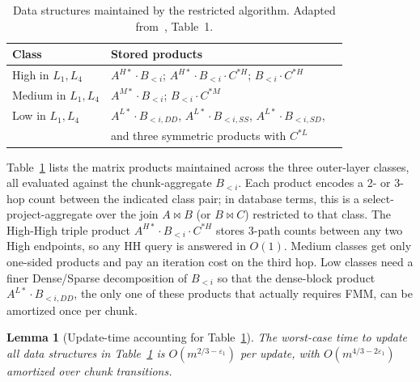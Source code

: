 \documentclass[sigconf,nonacm]{acmart}
\theoremstyle{plain}
\newtheorem{lemma}[theorem]{Lemma}
\theoremstyle{definition}
\begin{document}
\begin{table}[t]
  \centering
  \begin{tabular}{lll}
    \toprule
    Class & Stored products \\
    \midrule
    High in $L_1, L_4$    & $A^{H*}\!\cdot\!B_{<i}$;  $A^{H*}\!\cdot\!B_{<i}\!\cdot\!C^{*H}$;  $B_{<i}\!\cdot\!C^{*H}$ \\
    Medium in $L_1, L_4$  & $A^{M*}\!\cdot\!B_{<i}$;  $B_{<i}\!\cdot\!C^{*M}$ \\
    Low in $L_1, L_4$     & $A^{L*}\!\cdot\!B_{<i,DD}$, $A^{L*}\!\cdot\!B_{<i,SS}$, $A^{L*}\!\cdot\!B_{<i,SD}$, \\
                          & and three symmetric products with $C^{*L}$ \\
    \bottomrule
  \end{tabular}
  \caption{Data structures maintained by the restricted algorithm. Adapted from~\cite{AssadiShah25}, Table~1.}
  \label{tab:datastructures}
\end{table}

Table~\ref{tab:datastructures} lists the matrix products
maintained across the three outer-layer classes, all evaluated
against the chunk-aggregate $B_{<i}$. Each product encodes a 2- or
3-hop count between the indicated class pair; in database terms,
this is a select-project-aggregate over the join $A \bowtie B$ (or
$B \bowtie C$) restricted to that class. The High-High triple
product $A^{H*}\!\cdot\!B_{<i}\!\cdot\!C^{*H}$ stores 3-path counts
between any two High endpoints, so any HH query is answered in
$O(1)$. Medium classes get only one-sided products and pay an
iteration cost on the third hop. Low classes need a finer
Dense/Sparse decomposition of $B_{<i}$ so that the dense-block
product $A^{L*}\!\cdot\!B_{<i,DD}$, the only one of these
products that actually requires FMM, can be amortized once per
chunk.

\begin{lemma}[Update-time accounting for Table~\ref{tab:datastructures}]
\label{lem:warmup-update}
The worst-case time to update all data structures in Table~\ref{tab:datastructures} is $O(m^{2/3-\varepsilon_1})$ per update, with $O(m^{4/3-2\varepsilon_1})$ amortized over chunk transitions.
\end{lemma}
\end{document}
